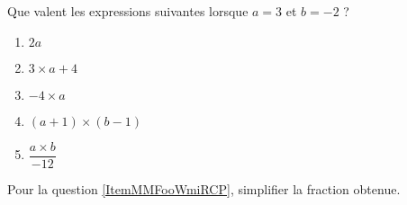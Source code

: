 
\begin{exercice}\label{exosmath-0896}

    Que valent les expressions suivantes lorsque \( a=3\) et \( b=-2\) ?
    \begin{multicols}{2}
        \begin{enumerate}
            \item
                \( 2a\)
            \item
                \( 3\times a+4\)
            \item
                \(  -4\times a\)
            \item
                \( (a+1)\times (b-1)\)
            \item   \label{ItemMMFooWmiRCP}
                \( \dfrac{ a\times b }{ -12 }\)
        \end{enumerate}
    \end{multicols}
    Pour la question \ref{ItemMMFooWmiRCP}, simplifier la fraction obtenue.

\end{exercice}

